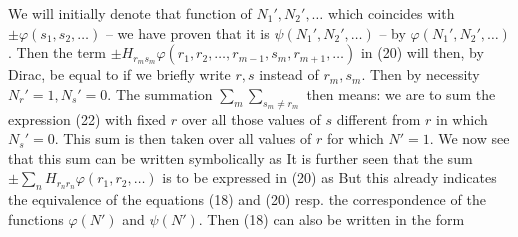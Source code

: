 \begin{paper}{1}
We will initially denote that function of $N_1',N_2',\dots$ which coincides with $\pm\varphi(s_1,s_2,\dots)$ -- we have proven that it is $\psi(N_1',N_2',\dots)$ -- by $\varphi(N_1',N_2',\dots)$. Then the term $\pm H_{r_m s_m} \varphi(r_1,r_2,\dots,r_{m-1},s_m,r_{m+1},\dots)$ in (20) will then, by Dirac, be equal to
if we briefly write $r,s$ instead of $r_m,s_m$. Then by necessity $N_r'=1,N_s'=0$. The summation $\sum\limits_m \sum\limits_{s_m\neq r_m}$ then means: we are to sum the expression (22) with fixed $r$ over all those values of $s$ different from $r$ in which $N_s'=0$. This sum is then taken over all values of $r$ for which $N'=1$. We now see that this sum can be written symbolically as
It is further seen that the sum $\pm\sum\limits_n H_{r_n r_n}\varphi(r_1,r_2,\dots)$ is to be expressed in (20) as
But this already indicates the equivalence of the equations (18) and (20) resp. the correspondence of the functions $\varphi(N')$ and $\psi(N')$. Then (18) can also be written in the form


\end{paper}
